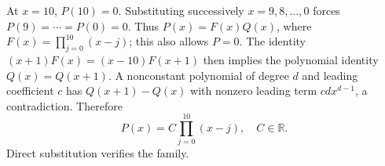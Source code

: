 At $x=10$, $P(10)=0$. Substituting successively $x=9,8,\ldots,0$ forces $P(9)=\cdots=P(0)=0$. Thus
$P(x)=F(x)Q(x)$, where $F(x)=\prod_{j=0}^{10}(x-j)$; this also allows $P=0$.
The identity $(x+1)F(x)=(x-10)F(x+1)$ then implies the polynomial identity $Q(x)=Q(x+1)$. A nonconstant polynomial of degree $d$ and leading coefficient $c$ has $Q(x+1)-Q(x)$ with nonzero leading term $cdx^{d-1}$, a contradiction. Therefore
\[
\boxed{P(x)=C\prod_{j=0}^{10}(x-j),\quad C\in\mathbb R}.
\]
Direct substitution verifies the family.
